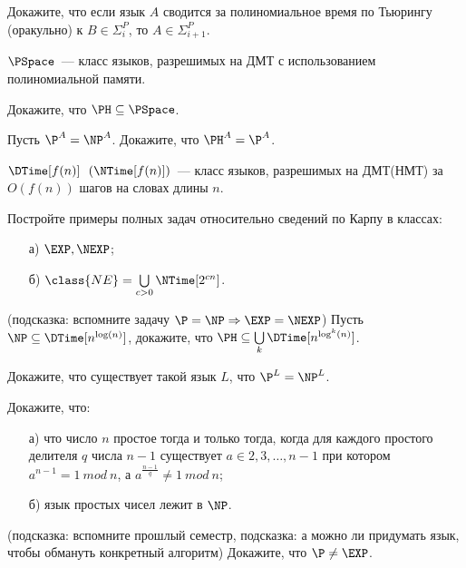 

\begin{task}
	Докажите, что если язык $A$ сводится за полиномиальное время по Тьюрингу (оракульно) к $B \in \Sigma_i^P$, то $A \in
    \Sigma_{i + 1}^P$.    
\end{task}


$\PSpace$~--- класс языков, разрешимых на ДМТ с использованием полиномиальной памяти.

\begin{task}
    Докажите, что $\PH \subseteq \PSpace$.
\end{task}

\begin{task}
    Пусть $\P^{A} = \NP^{A}$. Докажите, что $\PH^{A} = \P^{A}$.
\end{task}

$\DTime[f(n)]~~(\NTime[f(n)]) $~--- класс языков, разрешимых на ДМТ(НМТ) за $O(f(n))$ шагов на словах длины $n$.

\begin{task}
	Постройте примеры полных задач относительно сведений по Карпу в классах:
    \begin{enumerate}[topsep = 0pt, itemsep = -1ex]
        \item [а)] $\EXP, \NEXP$;
        \item [б)] $\class{NE} = \bigcup\limits_{c > 0} \NTime[2^{cn}]$.
	\end{enumerate}
\end{task}

\begin{task}(подсказка: вспомните задачу $\P = \NP \Rightarrow \EXP = \NEXP$)
    Пусть $\NP \subseteq \DTime[n^{\log(n)}]$, докажите, что $\PH \subseteq \bigcup\limits_{k} \DTime[n^{\log^k(n)}]$.
\end{task}

\begin{task}
    Докажите, что существует такой язык $L$, что $\P^{L} = \NP^{L}$.
\end{task}




\breakline


\begin{task}
    Докажите, что:
   	\begin{enumerate}[topsep = 0pt, itemsep = -1ex]
        \item [а)] что число $n$ простое тогда и только тогда, когда для каждого простого делителя $q$ числа $n - 1$ существует $a
            \in {2, 3, \dots, n - 1}$ при котором $a^{n - 1} = 1~mod~n$, а $a^{\frac{n - 1}{q}} \ne 1~mod~n$;
        \item [б)] язык простых чисел лежит в $\NP$.
	\end{enumerate}
\end{task}


\begin{task} (подсказка: вспомните прошлый семестр, подсказка: а можно ли придумать язык, чтобы обмануть конкретный алгоритм)
    Докажите, что $\P \neq \EXP$.
\end{task}


